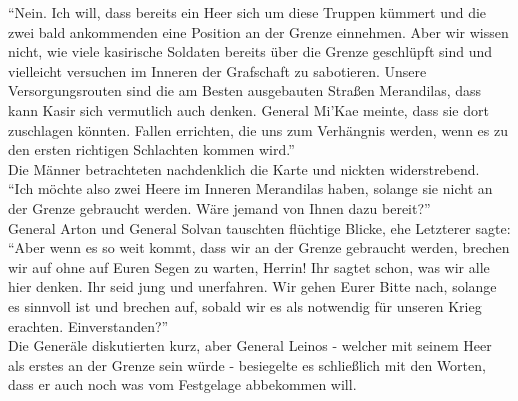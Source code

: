 ``Nein. Ich will, dass bereits ein Heer sich um diese Truppen kümmert und die zwei bald ankommenden 
eine Position an der Grenze einnehmen. Aber wir wissen nicht, wie viele kasirische Soldaten bereits 
über die Grenze geschlüpft sind und vielleicht versuchen im Inneren der Grafschaft zu sabotieren. 
Unsere Versorgungsrouten sind die am Besten ausgebauten Straßen Merandilas, dass kann Kasir sich 
vermutlich auch denken. General Mi'Kae meinte, dass sie dort zuschlagen könnten. Fallen errichten, 
die uns zum Verhängnis werden, wenn es zu den ersten richtigen Schlachten kommen wird.''\\
Die Männer betrachteten nachdenklich die Karte und nickten widerstrebend.\\
``Ich möchte also zwei Heere im Inneren Merandilas haben, solange sie nicht an der Grenze gebraucht 
werden. Wäre jemand von Ihnen dazu bereit?''\\
General Arton und General Solvan tauschten flüchtige Blicke, ehe Letzterer sagte: ``Aber wenn es so 
weit kommt, dass wir an der Grenze gebraucht werden, brechen wir auf ohne auf Euren Segen zu 
warten, Herrin! Ihr sagtet schon, was wir alle hier denken. Ihr seid jung und unerfahren. Wir gehen 
Eurer Bitte nach, solange es sinnvoll ist und brechen auf, sobald wir es als notwendig für unseren 
Krieg erachten. Einverstanden?''\\
Die Generäle diskutierten kurz, aber General Leinos - welcher mit seinem Heer als erstes an der 
Grenze sein würde - besiegelte es schließlich mit den Worten, dass er auch noch was vom Festgelage 
abbekommen will.\\


